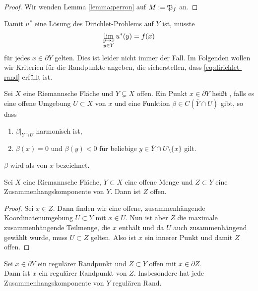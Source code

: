 \begin{proof}
  Wir wenden Lemma \ref{lemma:perron} auf $M := \mathfrak{P}_f$ an.
\end{proof}

\begin{rem}
  Damit $u^\ast$ eine Lösung des Dirichlet-Problems auf $Y$ ist,
  müsste
  \begin{align}
  \lim_{\substack{y\rightarrow x\\y \in Y}}u^\ast(y) =
  f(x) \label{eq:dirichlet-rand} 
  \end{align}
  für jedes $x \in \partial Y$ gelten. Dies ist leider nicht immer der
  Fall. Im Folgenden wollen wir Kriterien für die Randpunkte angeben,
  die sicherstellen, dass \eqref{eq:dirichlet-rand} erfüllt ist.
\end{rem}

\begin{defin}
  Sei $X$ eine Riemannsche Fläche und  $Y \subsetneq X$ offen. Ein
  Punkt $x \in \partial Y$ heißt , falls es eine
  offene Umgebung $U \subset X$ von $x$ und eine Funktion $\beta  \in
  C(\bar Y \cap U)$ gibt, so dass
  \begin{enumerate}
  \item $\beta|_{Y \cap U}$ harmonisch ist,
  \item $\beta(x) =0$ und $\beta(y) < 0$ für beliebige $y \in \bar Y
    \cap U \setminus \{x\}$ gilt.
  \end{enumerate}
  $\beta$ wird als  von $x$ bezeichnet.
\end{defin}

\begin{lemma}
  \label{lemma:zsh-komp}
  Sei $X$ eine Riemannsche Fläche, $Y \subset X$ eine offene Menge und
  $Z \subset Y$ eine Zusammenhangskomponente von $Y$. Dann ist $Z$ offen.
\end{lemma}

\begin{proof}
  Sei $x \in Z$. Dann finden wir eine offene, zusammenhängende
  Koordinatenumgebung $U \subset Y$ mit $x \in U$. Nun ist aber
  $Z$ die maximale zusammenhängende Teilmenge, die $x$ enthält und da
  $U$ auch zusammenhängend gewählt wurde, muss $U \subset Z$
  gelten. Also ist $x$ ein innerer Punkt und damit $Z$ offen.
\end{proof}

\begin{cor}
  Sei $x \in \partial Y$ ein regulärer Randpunkt und $Z \subset Y$
  offen mit $x \in \partial Z$.\\
  Dann ist $x$ ein regulärer Randpunkt von $Z$. Insbesondere hat jede
  Zusammenhangskomponente von $Y$ regulären Rand.
\end{cor}

